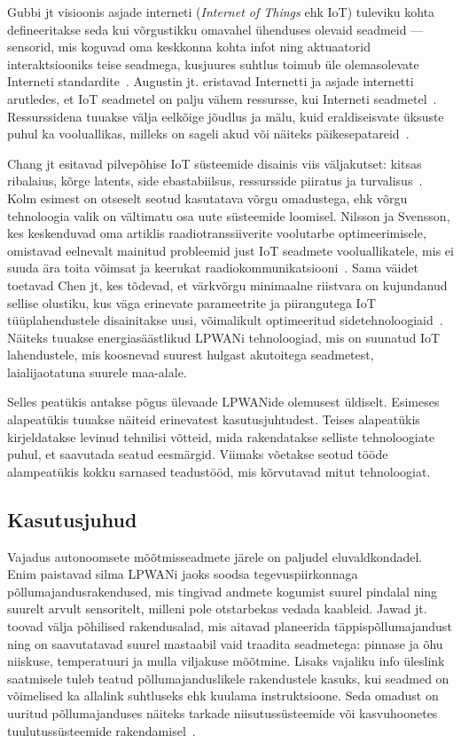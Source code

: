 \documentclass[12pt]{article}
\begin{document}
    Gubbi jt visioonis asjade interneti (\textit{Internet of Things} ehk IoT) tuleviku kohta defineeritakse seda kui võrgustikku omavahel ühenduses olevaid seadmeid — sensorid, mis koguvad oma keskkonna kohta infot ning aktuaatorid interaktsiooniks teise seadmega, kusjuures suhtlus toimub üle olemasolevate Interneti standardite~\cite{gubbi2013internet}.
    Augustin jt. eristavad Internetti ja asjade internetti arutledes, et IoT seadmetel on palju vähem ressursse, kui Interneti seadmetel~\cite{augustin2016study}.
    Ressurssidena tuuakse välja eelkõige jõudlus ja mälu, kuid eraldiseisvate üksuste puhul ka vooluallikas, milleks on sageli akud või näiteks päikesepatareid~\cite{mabon2019smaller}.

    Chang jt esitavad pilvepõhise IoT süsteemide disainis viis väljakutset: kitsas ribalaius, kõrge latents, side ebastabiilsus, ressursside piiratus ja turvalisus~\cite{chang2019internet}.
    Kolm esimest on otseselt seotud kasutatava võrgu omadustega, ehk võrgu tehnoloogia valik on vältimatu osa uute süsteemide loomisel.
    Nilsson ja Svensson, kes keskenduvad oma artiklis raadiotranssiiverite voolutarbe optimeerimisele, omistavad eelnevalt mainitud probleemid just IoT seadmete vooluallikatele, mis ei suuda ära toita võimsat ja keerukat raadiokommunikatsiooni~\cite{nilsson2014power}.
    Sama väidet toetavad Chen jt, kes tõdevad, et värkvõrgu minimaalne riistvara on kujundanud sellise olustiku, kus väga erinevate parameetrite ja piirangutega IoT tüüplahendustele disainitakse uusi, võimalikult optimeeritud sidetehnoloogiaid~\cite{chen2018cognitive}.
    Näiteks tuuakse energiasäästlikud LPWANi tehnoloogiad, mis on suunatud IoT lahendustele, mis koosnevad suurest hulgast akutoitega seadmetest, laialijaotatuna suurele maa-alale.

    Selles peatükis antakse põgus ülevaade LPWANide olemusest üldiselt.
    Esimeses alapeatükis tuuakse näiteid erinevatest kasutusjuhtudest.
    Teises alapeatükis kirjeldatakse levinud tehnilisi võtteid, mida rakendatakse selliste tehnoloogiate puhul, et saavutada seatud eesmärgid.
    Viimaks võetakse seotud tööde alampeatükis kokku sarnased teadustööd, mis kõrvutavad mitut tehnoloogiat.

    \subsection{Kasutusjuhud}

    Vajadus autonoomsete mõõtmisseadmete järele on paljudel eluvaldkondadel. Enim paistavad silma LPWANi jaoks soodsa tegevuspiirkonnaga põllumajandusrakendused, mis tingivad andmete kogumist suurel pindalal ning suurelt arvult sensoritelt, milleni pole otstarbekas vedada kaableid.
    Jawad jt.~\cite{jawad2017energy} toovad välja põhilised rakendusalad, mis aitavad planeerida täppispõllumajandust ning on saavutatavad suurel mastaabil vaid traadita seadmetega: pinnase ja õhu niiskuse, temperatuuri ja mulla viljakuse mõõtmine.
    Lisaks vajaliku info üleslink saatmisele tuleb teatud põllumajanduslikele rakendustele kasuks, kui seadmed on võimelised ka allalink suhtluseks ehk kuulama instruktsioone.
    Seda omadust on uuritud põllumajanduses näiteks tarkade niisutussüsteemide või kasvuhoonetes tuulutussüsteemide rakendamisel~\cite{abba2019design}.
\end{document}
